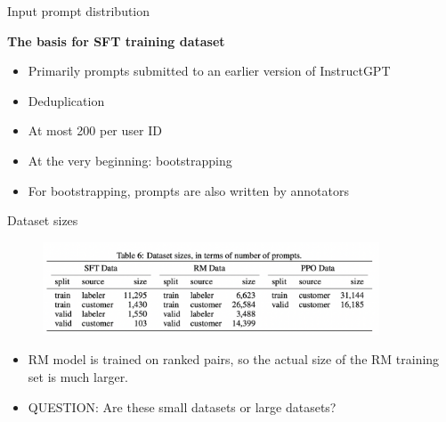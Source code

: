 \begin{vbframe}{Input prompt distribution}

\vfill

\textbf{The basis for SFT training dataset}

	\begin{itemize}
	\item Primarily prompts submitted to an earlier
          version of InstructGPT
          \item Deduplication
        \item At most 200 per user ID
        \item At the very beginning: bootstrapping
          \item For bootstrapping, prompts are also written
            by annotators
	\end{itemize}

\vfill

\end{vbframe}

\begin{vbframe}{Dataset sizes}

\vfill

\begin{figure}
\centering
\includegraphics[width = 10cm]{figure/datasetsize.png}
\end{figure}

\begin{itemize}
	\item RM model is trained on ranked pairs, so the
	actual size of the RM training set is much larger.
	\item QUESTION: Are these small datasets or large datasets?
\end{itemize}

\vfill

\end{vbframe}

